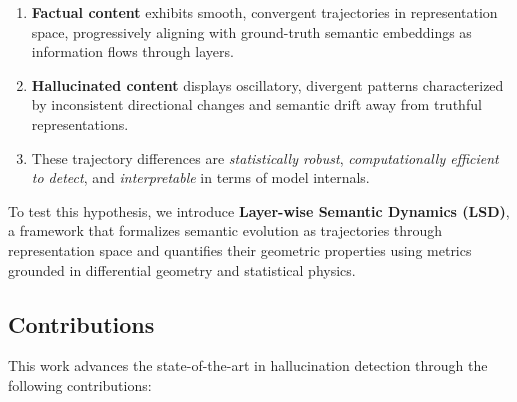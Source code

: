\documentclass[11pt]{article}
\begin{document}
\begin{enumerate}[leftmargin=*]
    \item \textbf{Factual content} exhibits smooth, convergent trajectories in representation space, progressively aligning with ground-truth semantic embeddings as information flows through layers.
    
    \item \textbf{Hallucinated content} displays oscillatory, divergent patterns characterized by inconsistent directional changes and semantic drift away from truthful representations.
    
    \item These trajectory differences are \emph{statistically robust}, \emph{computationally efficient to detect}, and \emph{interpretable} in terms of model internals.
\end{enumerate}

To test this hypothesis, we introduce \textbf{Layer-wise Semantic Dynamics (LSD)}, a framework that formalizes semantic evolution as trajectories through representation space and quantifies their geometric properties using metrics grounded in differential geometry and statistical physics.

\subsection{Contributions}

This work advances the state-of-the-art in hallucination detection through the following contributions:
\end{document}
